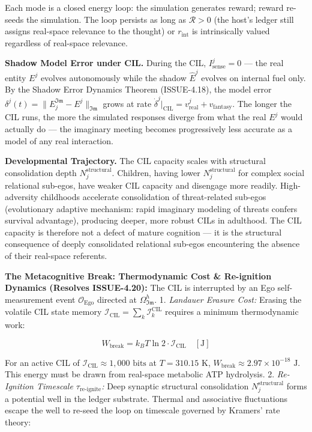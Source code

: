 \documentclass[11pt,a4paper]{article}
\theoremstyle{definition}
\theoremstyle{remark}
\begin{document}
Each mode is a closed energy loop: the simulation generates reward; reward re-seeds the simulation. The loop persists as long as $\mathcal{R} > 0$ (the host's ledger still assigns real-space relevance to the thought) or $r_{\text{int}}$ is intrinsically valued regardless of real-space relevance.

\textbf{Shadow Model Error under CIL.} During the CIL, $I_{\text{sense}}^j = 0$ — the real entity $E^j$ evolves autonomously while the shadow $\hat{E}^j$ evolves on internal fuel only. By the Shadow Error Dynamics Theorem (ISSUE-4.18), the model error $\delta^j(t) = \|E_j^{\mathfrak{Im}} - E^j\|_{\mathfrak{Im}}$ grows at rate $\dot{\delta}^j|_{\text{CIL}} = v^j_{\text{real}} + v_{\text{fantasy}}$. The longer the CIL runs, the more the simulated responses diverge from what the real $E^j$ would actually do — the imaginary meeting becomes progressively less accurate as a model of any real interaction.

\textbf{Developmental Trajectory.} The CIL capacity scales with structural consolidation depth $N_j^{\text{structural}}$. Children, having lower $N_j^{\text{structural}}$ for complex social relational sub-egos, have weaker CIL capacity and disengage more readily. High-adversity childhoods accelerate consolidation of threat-related sub-egos (evolutionary adaptive mechanism: rapid imaginary modeling of threats confers survival advantage), producing deeper, more robust CILs in adulthood. The CIL capacity is therefore not a defect of mature cognition — it is the structural consequence of deeply consolidated relational sub-egos encountering the absence of their real-space referents.

\textbf{The Metacognitive Break: Thermodynamic Cost \& Re-ignition Dynamics (Resolves ISSUE-4.20):}
The CIL is interrupted by an Ego self-measurement event $\mathcal{O}_{\text{Ego}}$ directed at $\Omega_{\mathfrak{Im}}^h$.
1. \textit{Landauer Erasure Cost:} Erasing the volatile CIL state memory $\mathcal{I}_{\text{CIL}} = \sum_k \mathcal{I}_k^{\text{CIL}}$ requires a minimum thermodynamic work:


\begin{equation}
W_{\text{break}} = k_B T \ln 2 \cdot \mathcal{I}_{\text{CIL}} \quad [\text{J}]
\end{equation}


For an active CIL of $\mathcal{I}_{\text{CIL}} \approx 1{,}000\text{ bits}$ at $T = 310.15\text{ K}$, $W_{\text{break}} \approx 2.97 \times 10^{-18}\text{ J}$. This energy must be drawn from real-space metabolic ATP hydrolysis.
2. \textit{Re-Ignition Timescale $\tau_{\text{re-ignite}}$:} Deep synaptic structural consolidation $N_j^{\text{structural}}$ forms a potential well in the ledger substrate. Thermal and associative fluctuations escape the well to re-seed the loop on timescale governed by Kramers' rate theory:
\end{document}
